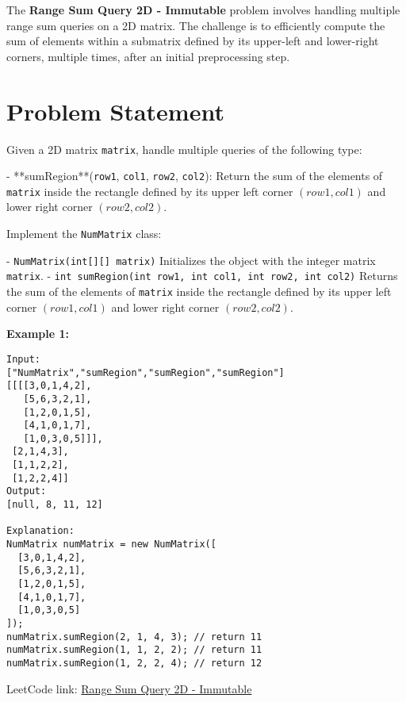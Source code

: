 
\label{problem:range_sum_query_2d_immutable}

The \textbf{Range Sum Query 2D - Immutable} problem involves handling multiple range sum queries on a 2D matrix. The challenge is to efficiently compute the sum of elements within a submatrix defined by its upper-left and lower-right corners, multiple times, after an initial preprocessing step.

\section*{Problem Statement}

Given a 2D matrix \texttt{matrix}, handle multiple queries of the following type:

- **sumRegion**(\texttt{row1}, \texttt{col1}, \texttt{row2}, \texttt{col2}): Return the sum of the elements of \texttt{matrix} inside the rectangle defined by its upper left corner \((row1, col1)\) and lower right corner \((row2, col2)\).

Implement the \texttt{NumMatrix} class:

- \texttt{NumMatrix(int[][] matrix)} Initializes the object with the integer matrix \texttt{matrix}.
- \texttt{int sumRegion(int row1, int col1, int row2, int col2)} Returns the sum of the elements of \texttt{matrix} inside the rectangle defined by its upper left corner \((row1, col1)\) and lower right corner \((row2, col2)\).

\textbf{Example 1:}
\begin{verbatim}
Input:
["NumMatrix","sumRegion","sumRegion","sumRegion"]
[[[[3,0,1,4,2],
   [5,6,3,2,1],
   [1,2,0,1,5],
   [4,1,0,1,7],
   [1,0,3,0,5]]],
 [2,1,4,3],
 [1,1,2,2],
 [1,2,2,4]]
Output:
[null, 8, 11, 12]

Explanation:
NumMatrix numMatrix = new NumMatrix([
  [3,0,1,4,2],
  [5,6,3,2,1],
  [1,2,0,1,5],
  [4,1,0,1,7],
  [1,0,3,0,5]
]);
numMatrix.sumRegion(2, 1, 4, 3); // return 11
numMatrix.sumRegion(1, 1, 2, 2); // return 11
numMatrix.sumRegion(1, 2, 2, 4); // return 12
\end{verbatim}

LeetCode link: \href{https://leetcode.com/problems/range-sum-query-2d-immutable/}{Range Sum Query 2D - Immutable}

